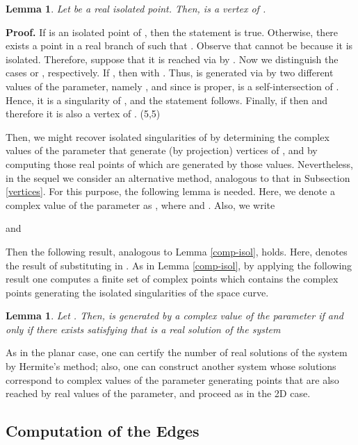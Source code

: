 \documentclass{elsart}
\def\qed{\hfill  \framebox(5,5){}}
\newtheorem{lemma}[theorem]{{\bf Lemma}}
\begin{document}
\begin{lemma} \label{lemma-isol}
Let  be a real isolated point. Then,  is a vertex of .
\end{lemma}

{\bf Proof.} If  is an isolated point of
, then the statement is true. Otherwise,
there exists a point  in a real branch of 
such that . Observe that  cannot be
 because it is isolated. Therefore, suppose that  it
is reached via  by . Now we
distinguish the cases  or ,
respectively. If , then 
with . Thus,  is generated via
 by two different values of the parameter, namely
, and since  is proper,  is a
self-intersection of . Hence, it is a
singularity of , and the statement
follows. Finally, if  then
 and therefore it is also a vertex of
. \qed

Then, we might recover isolated singularities of  by determining the complex values of the parameter that generate (by projection) vertices of , and by computing those real points of  which are generated by those values. Nevertheless, in the sequel we consider an alternative method, analogous to that in Subsection \ref{vertices}. For this purpose, the following lemma is needed. Here, we denote a complex value of the parameter  as , where  and . Also, we write

and

Then the following
result, analogous to Lemma \ref{comp-isol}, holds. Here,  denotes the result of substituting  in . As in Lemma \ref{comp-isol}, by applying the following result one computes a finite set of complex points which contains the complex points generating the isolated singularities of the space curve.

\begin{lemma} \label{isol-points-3d}
{Let . Then,  is generated by
a complex value of the parameter  if and only if
there exists  satisfying that  is
a real solution of the system }


\end{lemma}


As in the planar case, one can certify the number of real
solutions of the system by Hermite's method; also, one can
construct another system whose solutions correspond to complex
values of the parameter generating points that are also reached by
real values of the parameter, and proceed as in
the 2D case.

\subsection{Computation of the Edges}\label{edges-3d}
\end{document}

